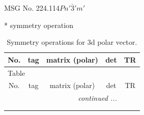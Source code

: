 \documentclass[fleqn,8pt]{jsarticle}
\begin{document}
\setcounter{MaxMatrixCols}{32}

\renewcommand{\tablename}{Table~}
\renewcommand{\figurename}{Figure~}
\begin{center}
\LARGE
MSG No. 224.114\quad$Pn'\bar{3}'m'$
\end{center}
* symmetry operation
\renewcommand{\arraystretch}{1.3}
\begin{longtable}{ccccc}
\caption{Symmetry operations for 3d polar vector.}
 \\
 \hline \hline
No. & tag & matrix (polar) & det & TR \\ \hline \endfirsthead

\multicolumn{4}{l}{\tablename\ \thetable{}} \\
 \hline \hline
No. & tag & matrix (polar) & det & TR \\ \hline \endhead

 \hline \hline
\multicolumn{4}{r}{\footnotesize\it continued ...} \\ \endfoot

 \hline \hline
\multicolumn{4}{r}{} \\ \endlastfoot


\end{longtable}
\end{document}
